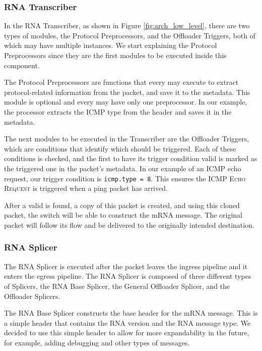 \subsubsection*{RNA Transcriber}

In the RNA Transcriber, as shown in Figure \ref{fig:arch_low_level}, there are two types of modules, the Protocol Preprocessors, and the Offloader Triggers, both of which may have multiple instances. We start explaining the Protocol Preprocessors since they are the first modules to be executed inside this component.

The Protocol Preprocessors are functions that every \ProtocolTemplate{} may execute to extract protocol-related information from the packet, and save it to the metadata. This module is optional and every \ProtocolTemplate{} may have only one preprocessor. In our example, the processor extracts the ICMP type from the header and saves it in the metadata.

The next modules to be executed in the Transcriber are the Offloader Triggers, which are conditions that identify which \Offloader{} should be triggered. Each of these conditions is checked, and the first \Offloader{} to have its trigger condition valid is marked as the triggered one in the packet's metadata. In our example of an ICMP echo request, our trigger condition is \texttt{icmp.type = 8}. This ensures the \Offloader{} \textsc{ICMP Echo Request} is triggered when a ping packet has arrived.


After a valid \Offloader{} is found, a copy of this packet is created, and using this cloned packet, the switch will be able to construct the mRNA message. The original packet will follow its flow and be delivered to the originally intended destination.

\subsubsection*{RNA Splicer}

The RNA Splicer is executed after the packet leaves the ingress pipeline and it enters the egress pipeline\footnotemark{}. The RNA Splicer is composed of three different types of Splicers, the RNA Base Splicer, the General Offloader Splicer, and the Offloader Splicers.

The RNA Base Splicer constructs the base header for the mRNA message. This is a simple header that contains the RNA version and the RNA message type. We decided to use this simple header to allow for more expandability in the future, for example, adding debugging and other types of messages.

